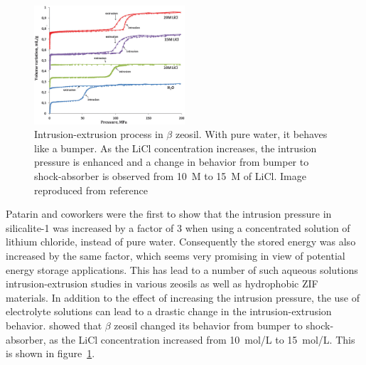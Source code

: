 \documentclass[thesis]{subfiles}
\begin{document}
\begin{figure}[b]
    \centering
    \includegraphics[width=0.5\textwidth]{figures/cited/intrusion-licl}
    \caption{Intrusion-extrusion process in $\beta$ zeosil. With pure water, it
    behaves like a bumper. As the LiCl concentration increases, the intrusion
    pressure is enhanced and a change in behavior from bumper to shock-absorber
    is observed from 10~M to 15~M of LiCl. Image reproduced from
    reference~\cite{Ryzhikov2014}}
    \label{fig:intrusion-licl}
\end{figure}

Patarin and coworkers\cite{Tzanis2014, Khay2014} were the first to show that the
intrusion pressure in silicalite-1 was increased by a factor of 3 when using a
concentrated solution of lithium chloride, instead of pure water. Consequently
the stored energy was also increased by the same factor, which seems very
promising in view of potential energy storage applications. This has lead to a
number of such aqueous solutions intrusion-extrusion studies in various zeosils
as well as hydrophobic ZIF materials. In addition to the effect of increasing
the intrusion pressure, the use of electrolyte solutions can lead to a drastic
change in the intrusion-extrusion behavior.
\citeauthor{Ryzhikov2014}\cite{Ryzhikov2014} showed that $\beta$ zeosil changed
its behavior from bumper to shock-absorber, as the LiCl concentration increased
from \SI{10}{mol/L} to \SI{15}{mol/L}. This is shown in
figure~\ref{fig:intrusion-licl}.
\end{document}
